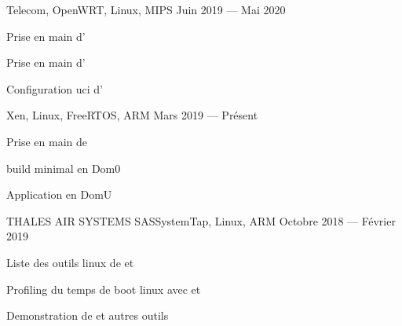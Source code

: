 
    {}{Telecom, OpenWRT, Linux, MIPS}
    {Juin 2019 --- Mai 2020}
    {\begin{additems}
        \item Prise en main d'
        \item Prise en main d'
        \item Configuration uci d'
    \end{additems}}

    {}{Xen, Linux, FreeRTOS, ARM}
    {Mars 2019 --- Présent}
    {\begin{additems}
        \item Prise en main de 
        \item {} build minimal en Dom0
        \item Application  en DomU
    \end{additems}}


    {THALES AIR SYSTEMS SAS}{SystemTap, Linux, ARM}
    {Octobre 2018 --- Février 2019}
    {\begin{additems}
        \item Liste des outils linux de  et 
        \item Profiling du temps de boot linux avec  et 
        \item Demonstration de  et autres outils
    \end{additems}}

